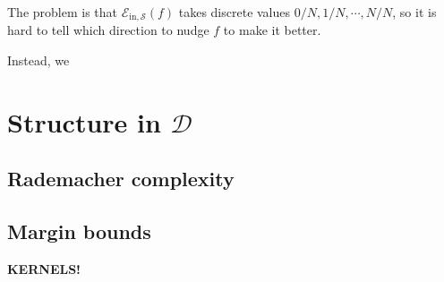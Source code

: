 \documentclass[openany, notitlepage, justified]{tufte-book}
\newcommand{\Dd}{\mathcal{D}}
\newcommand{\Ee}{\mathcal{E}}
\newcommand{\Ll}{\mathcal{L}}
\newcommand{\Ss}{\mathcal{S}}
\newcommand{\Ein}{\Ee_{\text{in},\Ss}}
\begin{document}
            The problem is that $\Ein(f)$ takes discrete values $0/N, 1/N,
            \cdots, N/N$, so it is hard to tell which direction to nudge $f$ to
            make it better.

            Instead, we 

    \newpage
    \chapter{Structure in $\Dd$}
        \section{Rademacher complexity}
        \section{Margin bounds}
            {\bf KERNELS!}



\end{document}
